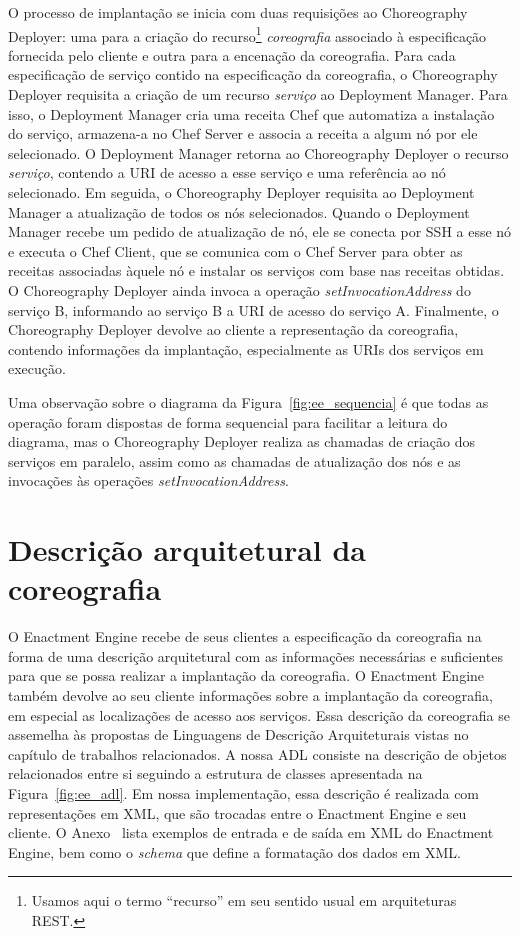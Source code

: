 O processo de implantação se inicia com duas requisições ao Choreography Deployer: uma para a criação do recurso\footnote{Usamos aqui o termo ``recurso'' em seu sentido usual em arquiteturas REST.} \emph{coreografia} associado à especificação fornecida pelo cliente e outra para a encenação da coreografia. Para cada especificação de serviço contido na especificação da coreografia, o Choreography Deployer requisita a criação de um recurso \emph{serviço} ao Deployment Manager. Para isso, o Deployment Manager cria uma receita Chef que automatiza a instalação do serviço, armazena-a no Chef Server e associa a receita a algum nó por ele selecionado. O Deployment Manager retorna ao Choreography Deployer o recurso \emph{serviço}, contendo a URI de acesso a esse serviço e uma referência ao nó selecionado. Em seguida, o Choreography Deployer requisita ao Deployment Manager a atualização de todos os nós selecionados. Quando o Deployment Manager recebe um pedido de atualização de nó, ele se conecta por SSH a esse nó e executa o Chef Client, que se comunica com o Chef Server para obter as receitas associadas àquele nó e instalar os serviços com base nas receitas obtidas. O Choreography Deployer ainda invoca a operação \emph{setInvocationAddress} do serviço B, informando ao serviço B a URI de acesso do serviço A. Finalmente, o Choreography Deployer devolve ao cliente a representação da coreografia, contendo informações da implantação, especialmente as URIs dos serviços em execução.

Uma observação sobre o diagrama da Figura~\ref{fig:ee_sequencia} é que todas as operação foram dispostas de forma sequencial para facilitar a leitura do diagrama, mas o Choreography Deployer realiza as chamadas de criação dos serviços em paralelo, assim como as chamadas de atualização dos nós e as invocações às operações \emph{setInvocationAddress}.

\section{Descrição arquitetural da coreografia}
\label{sec:adl}

O Enactment Engine recebe de seus clientes a especificação da coreografia na forma de uma descrição arquitetural com as informações necessárias e suficientes para que se possa realizar a implantação da coreografia. O Enactment Engine também devolve ao seu cliente informações sobre a implantação da coreografia, em especial as localizações de acesso aos serviços. Essa descrição da coreografia se assemelha às propostas de Linguagens de Descrição Arquiteturais vistas no capítulo de trabalhos relacionados. A nossa ADL consiste na descrição de objetos relacionados entre si seguindo a estrutura de classes apresentada na Figura~\ref{fig:ee_adl}. Em nossa implementação, essa descrição é realizada com representações em XML, que são trocadas entre o Enactment Engine e seu cliente. O Anexo~\cite{anexo:adl_xml} lista exemplos de entrada e de saída em XML do Enactment Engine, bem como o \emph{schema} que define a formatação dos dados em XML.  

